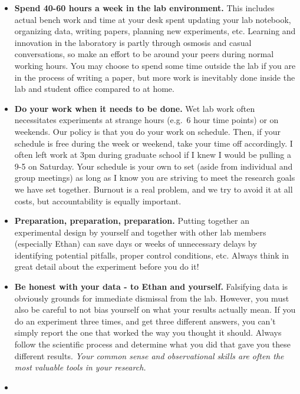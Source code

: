 \documentclass[
]{book}
\begin{document}
\begin{itemize}
\item
  \textbf{Spend 40-60 hours a week in the lab environment.} This includes actual bench work and time at your desk spent updating your lab notebook, organizing data, writing papers, planning new experiments, etc. Learning and innovation in the laboratory is partly through osmosis and casual conversations, so make an effort to be around your peers during normal working hours. You may choose to spend some time outside the lab if you are in the process of writing a paper, but more work is inevitably done inside the lab and student office compared to at home.
\item
  \textbf{Do your work when it needs to be done.} Wet lab work often necessitates experiments at strange hours (e.g.~6 hour time points) or on weekends. Our policy is that you do your work on schedule. Then, if your schedule is free during the week or weekend, take your time off accordingly. I often left work at 3pm during graduate school if I knew I would be pulling a 9-5 on Saturday. Your schedule is your own to set (aside from individual and group meetings) as long as I know you are striving to meet the research goals we have set together. Burnout is a real problem, and we try to avoid it at all costs, but accountability is equally important.
\item
  \textbf{Preparation, preparation, preparation.} Putting together an experimental design by yourself and together with other lab members (especially Ethan) can save days or weeks of unnecessary delays by identifying potential pitfalls, proper control conditions, etc. Always think in great detail about the experiment before you do it!
\item
  \textbf{Be honest with your data - to Ethan and yourself.} Falsifying data is obviously grounds for immediate dismissal from the lab. However, you must also be careful to not bias yourself on what your results actually mean. If you do an experiment three times, and get three different answers, you can't simply report the one that worked the way you thought it should. Always follow the scientific process and determine what you did that gave you these different results. \emph{Your common sense and observational skills are often the most valuable tools in your research.}
\item

\end{itemize}
\end{document}
